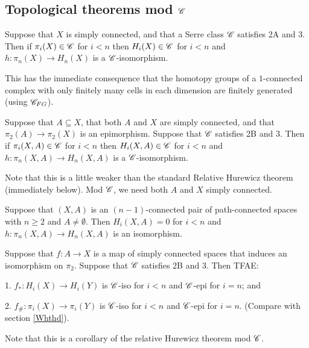 \documentclass[11pt]{article}
\begin{document}
\subsection{Topological theorems mod \texorpdfstring{$\mathscr{C}$}{C}}
\begin{thm*}
Suppose that $X$ is simply connected, and that a Serre class $\mathscr{C}$ satisfies \textup{2A} and \textup{3}. Then if $\pi_i(X)\in\mathscr{C}$ for $i<n$ then $H_i(X)\in\mathscr{C}$ for $i<n$ and $h:\pi_n(X)\to H_n(X)$ is a $\mathscr{C}$-isomorphism.
\end{thm*}
This has the immediate consequence that the homotopy groups of a $1$-connected complex with only finitely many cells in each dimension are finitely generated (using $\mathscr{C}_{FG}$).
\begin{thm*}
Suppose that $A\subseteq X$, that both $A$ and $X$ are simply connected, and that $\pi_2(A)\to\pi_2(X)$ is an epimorphism. Suppose that $\mathscr{C}$ satisfies \textup{2B} and \textup{3}. Then if $\pi_i(X,A)\in\mathscr{C}$ for $i<n$ then $H_i(X,A)\in\mathscr{C}$ for $i<n$ and $h:\pi_n(X,A)\to H_n(X,A)$ is a $\mathscr{C}$-isomorphism.
\end{thm*}
Note that this is a little weaker than the standard Relative Hurewicz theorem (immediately below). Mod $\mathscr{C}$, we need both $A$ and $X$ simply connected.
\begin{thm*}
Suppose that $(X,A)$ is an $(n-1)$-connected pair of path-connected spaces with $n\geq2$ and $A\neq\emptyset$. Then $H_i(X,A)=0$ for $i<n$ and $h:\pi_n(X,A)\to H_n(X,A)$ is an isomorphism.
\end{thm*}
\begin{thm*}\label{WhthdModC}
Suppose that $f:A\to X$ is a map of simply connected spaces that induces an isomorphism on $\pi_2$. Suppose that $\mathscr{C}$ satisfies \textup{2B} and \textup{3}. Then TFAE:
\begin{itemise}
\item[1.] $f_*:H_i(X)\to H_i(Y)$ is $\mathscr{C}$-iso for $i<n$ and $\mathscr{C}$-epi for $i=n$; and
\item[2.] $f_\#:\pi_i(X)\to \pi_i(Y)$ is $\mathscr{C}$-iso for $i<n$ and $\mathscr{C}$-epi for $i=n$. \hfill (Compare with section \ref{Whthd}).
\end{itemise}
\end{thm*}
Note that this is a corollary of the relative Hurewicz theorem mod $\mathscr{C}$.
\end{document}
